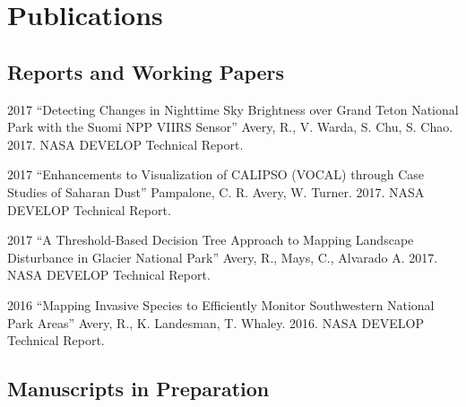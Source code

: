 \documentclass[12pt,letterpaper]{report}
\begin{document}
	
	
    	\section*{Publications}
	
	
	\subsection*{Reports and Working Papers}
	
	\begin{tablist}
		
		\item[2017] \tab \enquote{Detecting Changes in Nighttime Sky Brightness over Grand Teton National Park with the Suomi NPP VIIRS Sensor} Avery, R., V. Warda, S. Chu, S. Chao. 2017. NASA DEVELOP Technical Report. 

	    	\item[2017] \tab \enquote{Enhancements to Visualization of CALIPSO (VOCAL) through Case Studies of Saharan Dust} Pampalone, C. R. Avery, W. Turner. 2017. NASA DEVELOP Technical Report.

        	\item[2017] \tab \enquote{A Threshold-Based Decision Tree Approach to Mapping Landscape Disturbance in Glacier National Park} Avery, R., Mays, C., Alvarado A. 2017. NASA DEVELOP Technical Report.

        	\item[2016] \tab \enquote{Mapping Invasive Species to Efficiently Monitor Southwestern National Park Areas} Avery, R., K. Landesman, T. Whaley. 2016. NASA DEVELOP Technical Report.
	
        \end{tablist}
	
	
	\subsection*{Manuscripts in Preparation}
	
\end{document}

